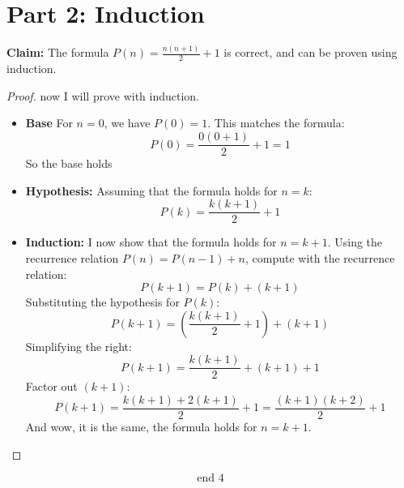 \documentclass[10pt, AMS Euler]{article}
\begin{document}
    \section*{Part 2: Induction}
    
    \noindent\textbf{Claim:} The formula $P(n) = \frac{n(n+1)}{2} + 1$ is correct, and can be proven using induction.
    
    \begin{proof}
        now I will prove with induction.
    
        \begin{itemize}
            \item \textbf{Base} For $n = 0$, we have $P(0) = 1$. This matches the formula:
            \[
            P(0) = \frac{0(0+1)}{2} + 1 = 1
            \]
            So the base holds
    
            \item \textbf{Hypothesis:} Assuming that the formula holds for $n = k$:
            \[
            P(k) = \frac{k(k+1)}{2} + 1
            \]
    
            \item \textbf{Induction:} I now show that the formula holds for $n = k+1$. Using the recurrence relation $P(n) = P(n-1) + n$, compute with the recurrence relation:
            \[
            P(k+1) = P(k) + (k+1)
            \]
            Substituting the hypothesis for $P(k)$:
            \[
            P(k+1) = \left( \frac{k(k+1)}{2} + 1 \right) + (k+1)
            \]
            Simplifying the right:
            \[
            P(k+1) = \frac{k(k+1)}{2} + (k+1) + 1
            \]
            Factor out $(k+1)$:
            \[
            P(k+1) = \frac{k(k+1) + 2(k+1)}{2} + 1 = \frac{(k+1)(k+2)}{2} + 1
            \]
            And wow, it is the same, the formula holds for $n = k+1$.
    
        \end{itemize}
        \end{proof}
        \[
        \boxed{\text{end 4}}
        \]
	\noindent \underline{\hspace{3in}}
\end{document}
